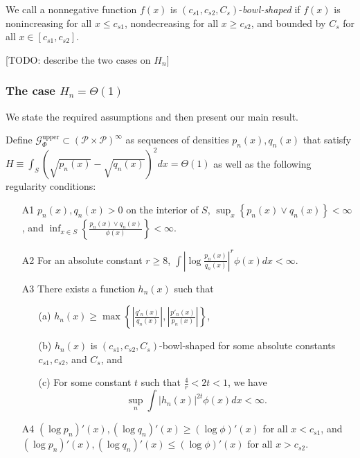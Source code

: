 \documentclass{article}
\begin{document}
\begin{definition}
We call a nonnegative function $f(x)$ is $(c_{s1}, c_{s2}, C_s)$-\emph{bowl-shaped} if $f(x)$ is nonincreasing for all $x \leq c_{s1}$, nondecreasing for all $x \geq c_{s2}$, and bounded by $C_s$ for all $x \in [c_{s1}, c_{s2}]$.
\end{definition}

[TODO: describe the two cases on $H_n$]

\subsubsection{The case $H_n = \Theta(1)$}


We state the required assumptions and then present our main result.


Define $\mathcal{G}^{\textrm{upper}}_\Phi \subset (\mathcal{P} \times \mathcal{P})^\infty$ as sequences of densities $p_n(x), q_n(x)$ that satisfy $H \equiv \int_S (\sqrt{p_n(x)} - \sqrt{q_n(x)})^2 dx = \Theta(1)$ as well as the following regularity conditions:

\begin{enumerate}
\item[A1] $p_n(x), q_n(x) > 0$ on the interior of $S$, $\sup_x \left\{p_n(x) \vee q_n(x)\right\} < \infty$, and $\inf_{x \in S} \left\{\frac{p_n(x) \vee q_n(x)}{\phi(x)}\right\} < \infty$. 
\item[A2] For an absolute constant $r \geq 8$, $\int \left| \log \frac{p_n(x)}{q_n(x)} \right|^r \phi(x) dx < \infty$.
\item[A3] There exists a function $h_n(x)$ such that
\begin{itemize}
\item[(a)] $h_n(x) \geq \max \left\{  \left|\frac{q'_n(x)}{q_n(x)} \right|,  \left|\frac{p'_n(x)}{p_n(x)}\right| \right\} $,
\item[(b)] $h_n(x)$ is $(c_{s1}, c_{s2}, C_s)$-bowl-shaped for some absolute constants $c_{s1}, c_{s2}$, and $C_s$, and
\item[(c)] For some constant $t$ such that $\frac{4}{r} < 2t < 1$, we have
$$ \sup_n \int |h_n(x)|^{2t} \phi(x) dx < \infty.$$
\end{itemize}

\item[A4]  $(\log p_n)'(x), (\log q_n)'(x) \geq (\log \phi)'(x)$ for all $x < c_{s1}$, and $ (\log p_n)'(x), (\log q_n)'(x) \leq (\log \phi)'(x)$ for all $x > c_{s2}$.
\end{enumerate}
\end{document}
